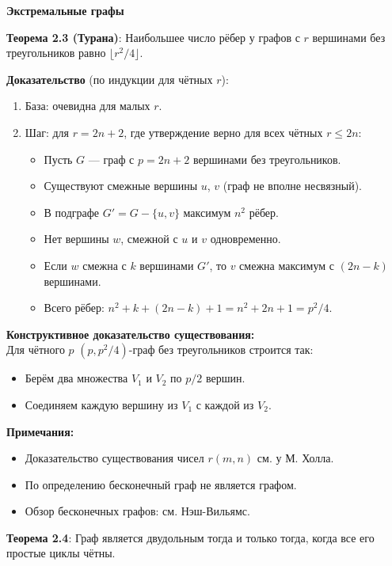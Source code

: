 \textbf{Экстремальные графы}

\noindent\textbf{Теорема 2.3 (Турана)}: Наибольшее число рёбер у графов с $r$ вершинами без треугольников равно $\lfloor r^2/4 \rfloor$.

\noindent\textbf{Доказательство} (по индукции для чётных $r$):
\begin{enumerate}
    \item База: очевидна для малых $r$.
    \item Шаг: для $r = 2n + 2$, где утверждение верно для всех чётных $r \leq 2n$:
    \begin{itemize}[noitemsep]
        \item Пусть $G$ — граф с $p = 2n + 2$ вершинами без треугольников.
        \item Существуют смежные вершины $u$, $v$ (граф не вполне несвязный).
        \item В подграфе $G' = G - \{u, v\}$ максимум $n^2$ рёбер.
        \item Нет вершины $w$, смежной с $u$ и $v$ одновременно.
        \item Если $w$ смежна с $k$ вершинами $G'$, то $v$ смежна максимум с $(2n - k)$ вершинами.
        \item Всего рёбер: $n^2 + k + (2n - k) + 1 = n^2 + 2n + 1 = p^2/4$.
    \end{itemize}
\end{enumerate}

\noindent\textbf{Конструктивное доказательство существования:}\\
Для чётного $p$ $(p, p^2/4)$-граф без треугольников строится так:
\begin{itemize}[noitemsep]
    \item Берём два множества $V_1$ и $V_2$ по $p/2$ вершин.
    \item Соединяем каждую вершину из $V_1$ с каждой из $V_2$.
\end{itemize}

\noindent\textbf{Примечания:}
\begin{itemize}[noitemsep]
    \item Доказательство существования чисел $r(m, n)$ см. у М. Холла.
    \item По определению бесконечный граф не является графом.
    \item Обзор бесконечных графов: см. Нэш-Вильямс.
\end{itemize}

\noindent\textbf{Теорема 2.4}: Граф является двудольным тогда и только тогда, когда все его простые циклы чётны.

